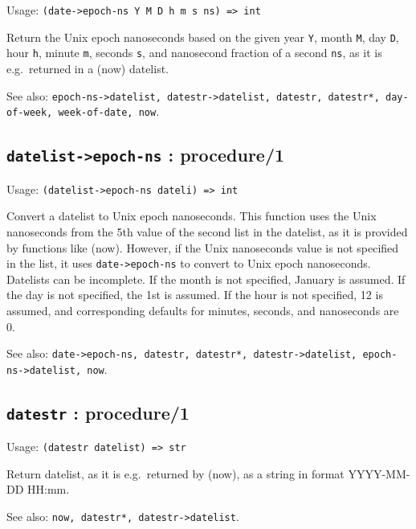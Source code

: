 \documentclass[
]{article}
\newcommand{\passthrough}[1]{#1}
\begin{document}
Usage: \passthrough{\lstinline!(date->epoch-ns Y M D h m s ns) => int!}

Return the Unix epoch nanoseconds based on the given year
\passthrough{\lstinline!Y!}, month \passthrough{\lstinline!M!}, day
\passthrough{\lstinline!D!}, hour \passthrough{\lstinline!h!}, minute
\passthrough{\lstinline!m!}, seconds \passthrough{\lstinline!s!}, and
nanosecond fraction of a second \passthrough{\lstinline!ns!}, as it is
e.g.~returned in a (now) datelist.

See also:
\passthrough{\lstinline!epoch-ns->datelist, datestr->datelist, datestr, datestr*, day-of-week, week-of-date, now!}.

\hypertarget{datelist-epoch-ns-procedure1-1}{%
\subsection{\texorpdfstring{\texttt{datelist-\textgreater{}epoch-ns} :
procedure/1}{datelist-\textgreater epoch-ns : procedure/1}}\label{datelist-epoch-ns-procedure1-1}}

Usage: \passthrough{\lstinline!(datelist->epoch-ns dateli) => int!}

Convert a datelist to Unix epoch nanoseconds. This function uses the
Unix nanoseconds from the 5th value of the second list in the datelist,
as it is provided by functions like (now). However, if the Unix
nanoseconds value is not specified in the list, it uses
\passthrough{\lstinline!date->epoch-ns!} to convert to Unix epoch
nanoseconds. Datelists can be incomplete. If the month is not specified,
January is assumed. If the day is not specified, the 1st is assumed. If
the hour is not specified, 12 is assumed, and corresponding defaults for
minutes, seconds, and nanoseconds are 0.

See also:
\passthrough{\lstinline!date->epoch-ns, datestr, datestr*, datestr->datelist, epoch-ns->datelist, now!}.

\hypertarget{datestr-procedure1-2}{%
\subsection{\texorpdfstring{\texttt{datestr} :
procedure/1}{datestr : procedure/1}}\label{datestr-procedure1-2}}

Usage: \passthrough{\lstinline!(datestr datelist) => str!}

Return datelist, as it is e.g.~returned by (now), as a string in format
YYYY-MM-DD HH:mm.

See also: \passthrough{\lstinline!now, datestr*, datestr->datelist!}.
\end{document}
